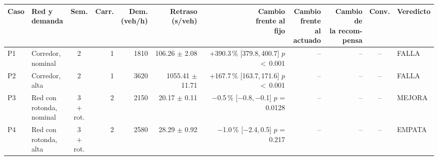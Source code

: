 \begin{table}[H]
\centering
\scriptsize
\setlength{\tabcolsep}{1.5pt}
\begin{tabular}{llcrrrrrrcl}
\toprule
Caso & \makecell[l]{Red y\\demanda} & Sem. & Carr. & \makecell{Dem.\\(veh/h)} & \makecell{Retraso\\(s/veh)} & \makecell{Cambio\\frente al\\fijo} & \makecell{Cambio\\frente al\\actuado} & \makecell{Cambio de\\la recom-\\pensa} & Conv. & Veredicto \\
\midrule
P1 & \makecell[l]{Corredor,\\{}nominal} & 2 & 1 & 1810 & \makecell[r]{106.26\\{}$\pm$ 2.08} & \makecell[r]{+390.3\,\%\\{}[379.8,\,400.7]\\$p$ $<$\,0.001} & -- & -- & -- & FALLA \\
P2 & \makecell[l]{Corredor,\\{}alta} & 2 & 1 & 3620 & \makecell[r]{1055.41\\{}$\pm$ 11.71} & \makecell[r]{+167.7\,\%\\{}[163.7,\,171.6]\\$p$ $<$\,0.001} & -- & -- & -- & FALLA \\
P3 & \makecell[l]{Red con\\{}rotonda,\\{}nominal} & \makecell[c]{3\\{}+ rot.} & 2 & 2150 & \makecell[r]{20.17\\{}$\pm$ 0.11} & \makecell[r]{$-$0.5\,\%\\{}[$-$0.8,\,$-$0.1]\\$p$ = 0.0128} & -- & -- & -- & MEJORA \\
P4 & \makecell[l]{Red con\\{}rotonda,\\{}alta} & \makecell[c]{3\\{}+ rot.} & 2 & 2580 & \makecell[r]{28.29\\{}$\pm$ 0.92} & \makecell[r]{$-$1.0\,\%\\{}[$-$2.4,\,0.5]\\$p$ = 0.217} & -- & -- & -- & EMPATA \\

\end{tabular}
\end{table}
